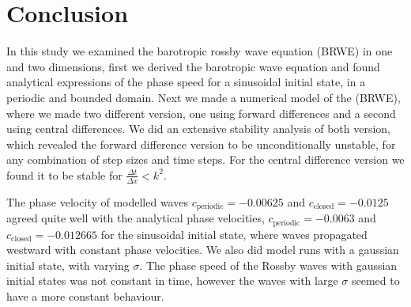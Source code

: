 \section{Conclusion}
In this study we examined the barotropic rossby wave equation (BRWE) in one and
two dimensions, first we derived
the barotropic wave equation and found analytical expressions of the phase
speed for a sinusoidal initial state, in a periodic and bounded domain.
Next we made a numerical model of the (BRWE), where we made two different
version, one using forward differences and a second using central differences.
We did an extensive stability analysis of both version, which revealed the
forward difference version to be unconditionally unstable, for any combination of
step sizes and time steps. For the central difference version we found it to be
stable for $\frac{\Delta t}{\Delta x} < k^2$.

The phase velocity of modelled waves $c_{\mathrm{periodic}}= - 0.00625$ and
$c_{\mathrm{closed}} = - 0.0125$ agreed quite well with the analytical phase
velocities, $c_{\mathrm{periodic}} = -0.0063$ and $c_{\mathrm{closed}} =
-0.012665$ for the
sinusoidal initial state, where waves propagated westward with constant
phase velocities. We also did model runs with a gaussian initial state, with
varying $\sigma$. The phase speed of the Rossby waves with gaussian
initial states was not constant in time, however the waves with large $\sigma$
seemed to have a more constant behaviour.
